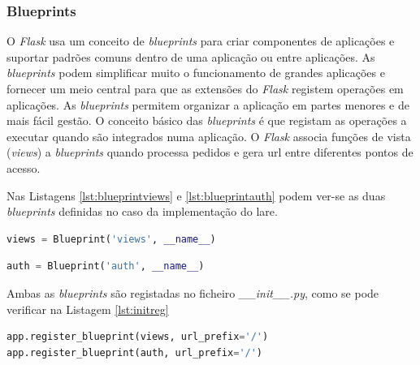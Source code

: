 \subsubsection{Blueprints}
O \textit{Flask} usa um conceito de \textit{blueprints} para criar componentes de aplicações e suportar padrões comuns dentro de uma aplicação ou entre aplicações. As \textit{blueprints} podem simplificar muito o funcionamento de grandes aplicações e fornecer um meio central para que as extensões do \textit{Flask} registem operações em aplicações. As \textit{blueprints} permitem organizar a aplicação em partes menores e de mais fácil gestão. O conceito básico das \textit{blueprints} é que registam as operações a executar quando são integrados numa aplicação. O \textit{Flask} associa funções de vista (\textit{views}) a \textit{blueprints} quando processa pedidos e gera \acrshort{url} entre diferentes pontos de acesso.

Nas Listagens \ref{lst:blueprintviews} e \ref{lst:blueprintauth} podem ver-se as duas \textit{blueprints} definidas no caso da implementação do \acrshort{lare}.
\begin{center}
	\begin{minipage}{0.7\linewidth}
		\begin{lstlisting}[language=Python, caption=\textit{Blueprint views} - \textit{views.py}, label=lst:blueprintviews]
views = Blueprint('views', __name__)
\end{lstlisting}
	\end{minipage}
\end{center}

\begin{center}
	\begin{minipage}{0.7\linewidth}
		\begin{lstlisting}[language=Python, caption=\textit{Blueprint auth} - \textit{auth.py}, label=lst:blueprintauth]
auth = Blueprint('auth', __name__)
\end{lstlisting}
	\end{minipage}
\end{center}

Ambas as \textit{blueprints} são registadas no ficheiro \textit{\_\_init\_\_.py}, como se pode verificar na Listagem \ref{lst:initreg}

\begin{center}
	\begin{minipage}{0.7\linewidth}
		\begin{lstlisting}[language=Python, caption=Registo das \textit{blueprints} - \textit{\_\_init\_\_.py}, label=lst:initreg]
app.register_blueprint(views, url_prefix='/')
app.register_blueprint(auth, url_prefix='/')
\end{lstlisting}
	\end{minipage}
\end{center}

